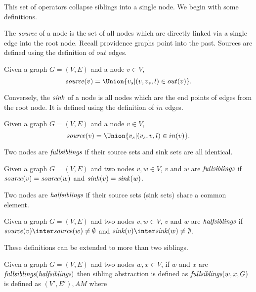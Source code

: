 \documentclass{elsarticle}
\begin{document}
This set of operators collapse siblings into a single node. We begin with some definitions.

The \emph{source} of a node is the set of all nodes which are directly linked via a single edge into the root node.  Recall providence graphs point into the past. Sources are defined using the definition of $out$ edges. 

\begin{definition}[$\source$] \label{def:source}
  Given a graph $G = (V,E)$ and a node $v \in V$,
  \[
  \source(v) = \Union\{v_s|(v,v_s,l) \in out(v)\}.
  \]
\end{definition}

Conversely, the $\sink$ of a node is all nodes which are the end points of edges from the root node.  It is defined using the definition of $in$ edges.

\begin{definition}[$\sink$] \label{def:sink}
  Given a graph $G = (V,E)$ and a node $v \in V$,
  \[
  \source(v) = \Union\{v_s|(v_s,v,l) \in in(v)\}.
  \]
\end{definition}

Two nodes are $\fullsiblings$ if their source sets and sink sets are all identical.  

\begin{definition}[$\fullsiblings$] \label{def:fullsiblings}
  Given a graph $G = (V,E)$ and two nodes $v,w \in V$, $v$ and $w$ are $\fullsiblings$ if $\mathit{source}(v) = \mathit{source}(w)$ and $\mathit{sink}(v) = \mathit{sink}(w)$. 
\end{definition}

Two nodes are $\halfsiblings$ if their source sets (sink sets) share a common element.  

\begin{definition}[$\halfsiblings$] \label{def:fullsiblings}
  Given a graph $G = (V,E)$ and two nodes $v,w \in V$, $v$ and $w$ are $\halfsiblings$ if $\source(v) \inter \source(w) \ne \emptyset$ and $\sink(v) \inter \sink(w) \ne \emptyset$. 
\end{definition}

These definitions can be extended to more than two siblings. 


\begin{definition}[\sibabs]\label{def:sibling-abstraction}
  Given a graph $G = (V,E)$ and two nodes $w,x \in V$, if $w$ and $x$ are  $\emph{fullsiblings}(\emph{halfsiblings})$ then sibling abstraction is defined as $\emph{fullsiblings}(w,x,G)$ is defined as $(V',E'),AM$ where
\end{definition}
\end{document}
